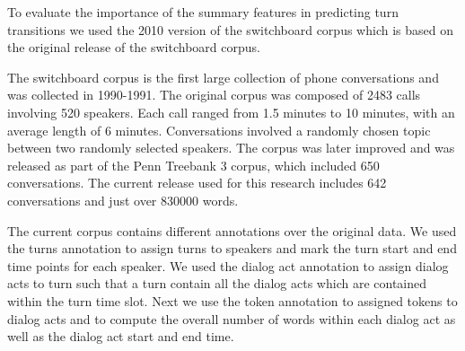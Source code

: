 To evaluate the importance of the summary features in predicting turn transitions we used the 2010 version of the switchboard corpus \cite{calhoun2010nxt} which is based on the original release \cite{225858} of the switchboard corpus.

The switchboard corpus is the first large collection of phone conversations and was collected in 1990-1991. The original corpus was composed of 2483 calls involving 520 speakers. Each call ranged from 1.5 minutes to 10 minutes, with an average length of 6 minutes. Conversations involved a randomly chosen topic between two randomly selected speakers. The corpus was later improved and was released as part of the Penn Treebank 3 corpus, which included 650 conversations. The current release used for this research includes 642 conversations and just over 830000 words.

The current corpus contains different annotations over the original data. We used the turns annotation to assign turns to speakers and mark the turn start and end time points for each speaker. We used the dialog act annotation to assign dialog acts to turn such that a turn contain all the dialog acts which are contained within the turn time slot. Next we use the token annotation to assigned tokens to dialog acts and to compute the overall number of words within each dialog act as well as the dialog act start and end time.



